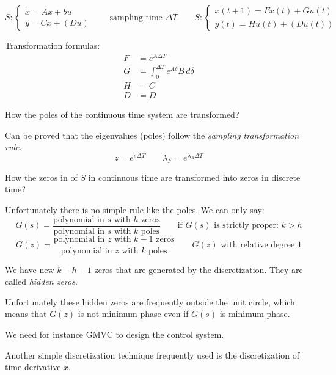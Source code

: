 \[
    S: \begin{cases}
        \dot{x} = Ax + bu \\
        y = Cx + (Du)
    \end{cases}
    \qquad
    \text{sampling time $\Delta T$}
    \qquad
    S: \begin{cases}
        x(t+1) = Fx(t) + Gu(t) \\
        y(t) = Hu(t) + (Du(t))
    \end{cases}
\]

Transformation formulas:
\begin{align*}
    F &= e^{A\Delta T} \\
    G &= \int_0^{\Delta T} e^{A\delta}B\, d\delta \\
    H &= C \\
    D &= D
\end{align*}

\begin{remark}
    How the poles of the continuous time system are transformed?

    Can be proved that the eigenvalues (poles) follow the \emph{sampling transformation rule}.
    \[
        z = e^{s\Delta T} \qquad \lambda_F = e^{\lambda_A \Delta T}
    \]


    How the zeros in of $S$ in continuous time are transformed into zeros in discrete time?

    Unfortunately there is no simple rule like the poles. We can only say:
    \[
        G(s) = \frac{\text{polynomial in $s$ with $h$ zeros}}{\text{polynomial in $s$ with $k$ poles}} \qquad \text{if $G(s)$ is strictly proper: } k > h
    \]
    \[
        G(z) = \frac{\text{polynomial in $z$ with $k-1$ zeros}}{\text{polynomial in $z$ with $k$ poles}} \qquad \text{$G(z)$ with relative degree 1}
    \]

    We have new $k-h-1$ zeros that are generated by the discretization.
    They are called \emph{hidden zeros}.

    Unfortunately these hidden zeros are frequently outside the unit circle, which means that $G(z)$ is not minimum phase even if $G(s)$ is minimum phase.

    We need for instance GMVC to design the control system.
\end{remark}

Another simple discretization technique frequently used is the discretization of time-derivative $\dot{x}$.

